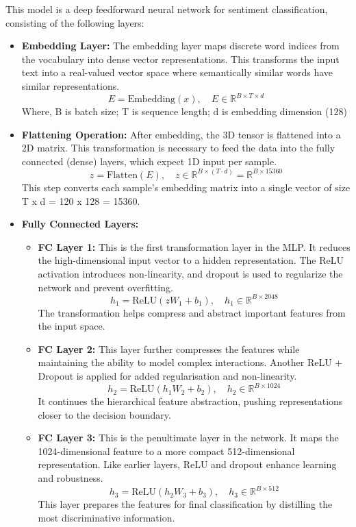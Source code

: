 \documentclass{article}
\begin{document}
This model is a deep feedforward neural network for sentiment classification, consisting of the following layers:
\begin{itemize}
\item \textbf{Embedding Layer:}
The embedding layer maps discrete word indices from the vocabulary into dense vector representations. This transforms the input text into a real-valued vector space where semantically similar words have similar representations.
\[
E = \text{Embedding}(x), \quad E \in \mathbb{R}^{B \times T \times d}
\]
Where, B is batch size; T is sequence length; d is embedding dimension (128)

\item \textbf{Flattening Operation:}
After embedding, the 3D tensor is flattened into a 2D matrix. This transformation is necessary to feed the data into the fully connected (dense) layers, which expect 1D input per sample.
\[
z = \text{Flatten}(E), \quad z \in \mathbb{R}^{B \times (T \cdot d)} = \mathbb{R}^{B \times 15360}
\]
This step converts each sample's embedding matrix into a single vector of size T x d = 120 x 128 = 15360.

\item \textbf{Fully Connected Layers:}
\begin{itemize}
\item \textbf{FC Layer 1:}
This is the first transformation layer in the MLP. It reduces the high-dimensional input vector to a hidden representation. The ReLU activation introduces non-linearity, and dropout is used to regularize the network and prevent overfitting.
\[
h_1 = \text{ReLU}(zW_1 + b_1), \quad h_1 \in \mathbb{R}^{B \times 2048}
\]
The transformation helps compress and abstract important features from the input space.

\item \textbf{FC Layer 2:}
This layer further compresses the features while maintaining the ability to model complex interactions. Another ReLU + Dropout is applied for added regularisation and non-linearity.
\[
h_2 = \text{ReLU}(h_1W_2 + b_2), \quad h_2 \in \mathbb{R}^{B \times 1024}
\]
It continues the hierarchical feature abstraction, pushing representations closer to the decision boundary.

\item \textbf{FC Layer 3:}
This is the penultimate layer in the network. It maps the 1024-dimensional feature to a more compact 512-dimensional representation. Like earlier layers, ReLU and dropout enhance learning and robustness.
\[
h_3 = \text{ReLU}(h_2W_3 + b_3), \quad h_3 \in \mathbb{R}^{B \times 512}
\]
This layer prepares the features for final classification by distilling the most discriminative information.


\end{itemize}
\end{itemize}
\end{document}
